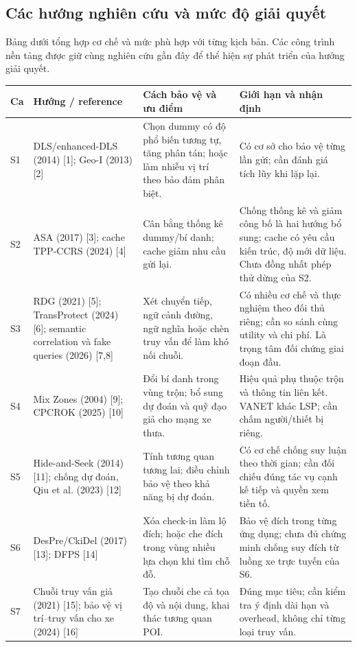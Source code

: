 \documentclass[10pt,a4paper]{article}
\begin{document}
\subsection{Các hướng nghiên cứu và mức độ giải quyết}
Bảng dưới tổng hợp cơ chế và mức phù hợp với từng kịch bản. Các công trình nền tảng được giữ cùng nghiên cứu gần đây để thể hiện sự phát triển của hướng giải quyết.
\par\small
\begin{tabularx}{\linewidth}{@{}P{0.65cm}P{3.25cm}Y Y@{}}
\toprule\textbf{Ca}&\textbf{Hướng / reference}&\textbf{Cách bảo vệ và ưu điểm}&\textbf{Giới hạn và nhận định}\\\midrule
S1 & DLS/enhanced-DLS (2014) [1]; Geo-I (2013) [2] & Chọn dummy có độ phổ biến tương tự, tăng phân tán; hoặc làm nhiễu vị trí theo bảo đảm phân biệt. & Có cơ sở cho bảo vệ từng lần gửi; cần đánh giá tích lũy khi lặp lại.\\
S2 & ASA (2017) [3]; cache TPP-CCRS (2024) [4] & Cân bằng thống kê dummy/bí danh; cache giảm nhu cầu gửi lại. & Chống thống kê và giảm công bố là hai hướng bổ sung; cache có yêu cầu kiến trúc, độ mới dữ liệu. Chưa đồng nhất phép thử dừng của S2.\\
S3 & RDG (2021) [5]; TransProtect (2024) [6]; semantic correlation và fake queries (2026) [7,8] & Xét chuyển tiếp, ngữ cảnh đường, ngữ nghĩa hoặc chèn truy vấn để làm khó nối chuỗi. & Có nhiều cơ chế và thực nghiệm theo đối thủ riêng; cần so sánh cùng utility và chi phí. Là trọng tâm đối chứng giai đoạn đầu.\\
S4 & Mix Zones (2004) [9]; CPCROK (2025) [10] & Đổi bí danh trong vùng trộn; bổ sung dự đoán và quỹ đạo giả cho mạng xe thưa. & Hiệu quả phụ thuộc trộn và thông tin liên kết. VANET khác LSP; cần chấm người/thiết bị riêng.\\
S5 & Hide-and-Seek (2014) [11]; chống dự đoán, Qiu et al. (2023) [12] & Tính tương quan tương lai; điều chỉnh bảo vệ theo khả năng bị dự đoán. & Có cơ chế chống suy luận theo thời gian; cần đối chiếu đúng tác vụ cạnh kế tiếp và quyền xem tiền tố.\\
S6 & DesPre/CkiDel (2017) [13]; DFPS [14] & Xóa check-in làm lộ đích; hoặc che đích trong vùng nhiều lựa chọn khi tìm chỗ đỗ. & Bảo vệ đích trong từng ứng dụng; chưa đủ chứng minh chống suy đích từ luồng xe trực tuyến của S6.\\
S7 & Chuỗi truy vấn giả (2021) [15]; bảo vệ vị trí--truy vấn cho xe (2024) [16] & Tạo chuỗi che cả tọa độ và nội dung, khai thác tương quan POI. & Đúng mục tiêu; cần kiểm tra ý định dài hạn và overhead, không chỉ từng loại truy vấn.\\

\end{tabularx}
\end{document}
